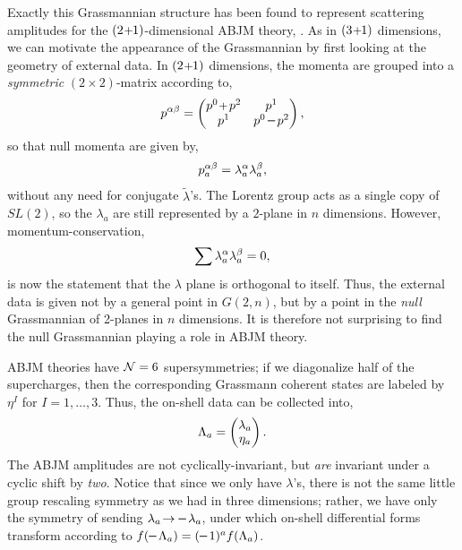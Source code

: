 \documentclass[12pt,hyperref,compress]{JHEP3}
\newcommand{\eq}[1]{\begin{equation}#1\end{equation}}
\newcommand{\mi}{{\rm\rule[2.4pt]{6pt}{0.65pt}}}
\newcommand{\pl}{\hspace{0.5pt}\text{{\small+}}\hspace{-0.5pt}}
\begin{document}
Exactly this Grassmannian structure has been found to represent scattering amplitudes for the $(2\pl1)$-dimensional ABJM theory, \cite{Bargheer:2010hn,Lee:2010du,Huang:2010qy,Gang:2010gy}. As in $(3\pl1)$ dimensions, we can motivate the appearance of the Grassmannian  by first looking at the geometry of external data. In $(2\pl1)$ dimensions, the momenta are grouped into a {\it symmetric} $(2\!\times\!2)$-matrix according to,
\vspace{-.4cm}\eq{p^{\alpha\beta} = \left(\begin{array}{@{}cc@{}} p^ 0\pl\,p^2 & p^1 \\ p^1 & p^0\,\mi\,p^2 \end{array} \right),\vspace{-.3cm}}
so that null momenta are given by,
\vspace{-.2cm}\eq{p_a^{\alpha\beta} = \lambda_a^{\alpha} \lambda_a^{\beta},\vspace{-.2cm}}
without any need for conjugate $\widetilde \lambda$'s. The Lorentz group acts as a single copy of $SL(2)$, so the $\lambda_a$ are still represented by a $2$-plane in $n$ dimensions. However, momentum-conservation,
\vspace{-.2cm}\eq{\sum \lambda_a^{\alpha} \lambda_a^{\beta}= 0,\vspace{-.2cm}}
is now the statement that the $\lambda$ plane is orthogonal to itself. Thus, the external data is given not by a general point in $G(2,n)$, but by a point in the  {\it null} Grassmannian of 2-planes in $n$ dimensions. It is therefore not surprising to find the null Grassmannian playing a role in ABJM theory.

ABJM theories have ${\cal N} = 6$ supersymmetries; if we diagonalize half of the supercharges, then the corresponding Grassmann coherent states are labeled by $\eta^I$ for $I = 1,\ldots, 3$. Thus, the on-shell data can be collected into,
\vspace{-.3cm}\eq{\Lambda_a = \left(\begin{array}{@{}c@{}} \lambda_a \\[-1pt] \eta_a \end{array} \right).\vspace{-.3cm}}
The ABJM amplitudes are not cyclically-invariant, but {\it are} invariant under a cyclic shift by {\it two}. Notice that since we only have $\lambda$'s, there is not the same little group rescaling symmetry as we had in three dimensions; rather, we have only the symmetry of sending
$\lambda_a\!\to\mi\, \lambda_a$, under which on-shell differential forms transform according to $f(\mi\,\Lambda_a) = (\mi\,1)^a f(\Lambda_a)$.
\end{document}
